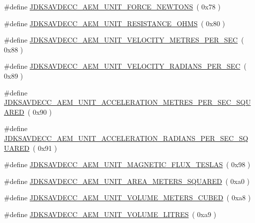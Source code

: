 \begin{DoxyCompactItemize}
\item 
\#define \hyperlink{group__units_ga3aa4ed7bb815db5c35d2cab1de482874}{J\+D\+K\+S\+A\+V\+D\+E\+C\+C\+\_\+\+A\+E\+M\+\_\+\+U\+N\+I\+T\+\_\+\+F\+O\+R\+C\+E\+\_\+\+N\+E\+W\+T\+O\+NS}~( 0x78 )
\item 
\#define \hyperlink{group__units_ga3d807d1a88c42ba6f0b4bfc6e78a3df4}{J\+D\+K\+S\+A\+V\+D\+E\+C\+C\+\_\+\+A\+E\+M\+\_\+\+U\+N\+I\+T\+\_\+\+R\+E\+S\+I\+S\+T\+A\+N\+C\+E\+\_\+\+O\+H\+MS}~( 0x80 )
\item 
\#define \hyperlink{group__units_ga68cafed8839c00078c0e784b137df877}{J\+D\+K\+S\+A\+V\+D\+E\+C\+C\+\_\+\+A\+E\+M\+\_\+\+U\+N\+I\+T\+\_\+\+V\+E\+L\+O\+C\+I\+T\+Y\+\_\+\+M\+E\+T\+R\+E\+S\+\_\+\+P\+E\+R\+\_\+\+S\+EC}~( 0x88 )
\item 
\#define \hyperlink{group__units_ga1cc71bb4e432deb1c4ae46a0d8102122}{J\+D\+K\+S\+A\+V\+D\+E\+C\+C\+\_\+\+A\+E\+M\+\_\+\+U\+N\+I\+T\+\_\+\+V\+E\+L\+O\+C\+I\+T\+Y\+\_\+\+R\+A\+D\+I\+A\+N\+S\+\_\+\+P\+E\+R\+\_\+\+S\+EC}~( 0x89 )
\item 
\#define \hyperlink{group__units_ga223335e718490d2b497b60353149b976}{J\+D\+K\+S\+A\+V\+D\+E\+C\+C\+\_\+\+A\+E\+M\+\_\+\+U\+N\+I\+T\+\_\+\+A\+C\+C\+E\+L\+E\+R\+A\+T\+I\+O\+N\+\_\+\+M\+E\+T\+R\+E\+S\+\_\+\+P\+E\+R\+\_\+\+S\+E\+C\+\_\+\+S\+Q\+U\+A\+R\+ED}~( 0x90 )
\item 
\#define \hyperlink{group__units_ga6f667e01c193bf23a50b6fb9b568cca9}{J\+D\+K\+S\+A\+V\+D\+E\+C\+C\+\_\+\+A\+E\+M\+\_\+\+U\+N\+I\+T\+\_\+\+A\+C\+C\+E\+L\+E\+R\+A\+T\+I\+O\+N\+\_\+\+R\+A\+D\+I\+A\+N\+S\+\_\+\+P\+E\+R\+\_\+\+S\+E\+C\+\_\+\+S\+Q\+U\+A\+R\+ED}~( 0x91 )
\item 
\#define \hyperlink{group__units_ga7da68abc56d273185f17e92a2d458aef}{J\+D\+K\+S\+A\+V\+D\+E\+C\+C\+\_\+\+A\+E\+M\+\_\+\+U\+N\+I\+T\+\_\+\+M\+A\+G\+N\+E\+T\+I\+C\+\_\+\+F\+L\+U\+X\+\_\+\+T\+E\+S\+L\+AS}~( 0x98 )
\item 
\#define \hyperlink{group__units_ga1b33f37d242c14bea22ef74f528e195b}{J\+D\+K\+S\+A\+V\+D\+E\+C\+C\+\_\+\+A\+E\+M\+\_\+\+U\+N\+I\+T\+\_\+\+A\+R\+E\+A\+\_\+\+M\+E\+T\+E\+R\+S\+\_\+\+S\+Q\+U\+A\+R\+ED}~( 0xa0 )
\item 
\#define \hyperlink{group__units_ga30cc8d3dc4a760172f91ad4a5cb03569}{J\+D\+K\+S\+A\+V\+D\+E\+C\+C\+\_\+\+A\+E\+M\+\_\+\+U\+N\+I\+T\+\_\+\+V\+O\+L\+U\+M\+E\+\_\+\+M\+E\+T\+E\+R\+S\+\_\+\+C\+U\+B\+ED}~( 0xa8 )
\item 
\#define \hyperlink{group__units_ga54409e906ac28579975a5f7307aeb38e}{J\+D\+K\+S\+A\+V\+D\+E\+C\+C\+\_\+\+A\+E\+M\+\_\+\+U\+N\+I\+T\+\_\+\+V\+O\+L\+U\+M\+E\+\_\+\+L\+I\+T\+R\+ES}~( 0xa9 )

\end{DoxyCompactItemize}

